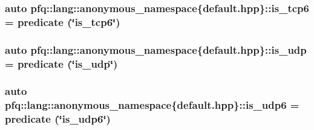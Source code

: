 \hypertarget{namespacepfq_1_1lang_1_1anonymous__namespace_02default_8hpp_03_a56d9bafc51ca6775da4ec3b816b1c7bb}{
\subsubsection[{is\+\_\+tcp6}]{\setlength{\rightskip}{0pt plus 5cm}auto pfq\+::lang\+::anonymous\+\_\+namespace\{default.\+hpp\}\+::is\+\_\+tcp6 = {\bf predicate} (\char`\"{}is\+\_\+tcp6\char`\"{})}}\label{namespacepfq_1_1lang_1_1anonymous__namespace_02default_8hpp_03_a56d9bafc51ca6775da4ec3b816b1c7bb}
\hypertarget{namespacepfq_1_1lang_1_1anonymous__namespace_02default_8hpp_03_a42701f36d9dde7f3636b90244d520a16}{
\subsubsection[{is\+\_\+udp}]{\setlength{\rightskip}{0pt plus 5cm}auto pfq\+::lang\+::anonymous\+\_\+namespace\{default.\+hpp\}\+::is\+\_\+udp = {\bf predicate} (\char`\"{}is\+\_\+udp\char`\"{})}}\label{namespacepfq_1_1lang_1_1anonymous__namespace_02default_8hpp_03_a42701f36d9dde7f3636b90244d520a16}
\hypertarget{namespacepfq_1_1lang_1_1anonymous__namespace_02default_8hpp_03_a8f3f79760f7be2ce30db5025bff887a6}{
\subsubsection[{is\+\_\+udp6}]{\setlength{\rightskip}{0pt plus 5cm}auto pfq\+::lang\+::anonymous\+\_\+namespace\{default.\+hpp\}\+::is\+\_\+udp6 = {\bf predicate} (\char`\"{}is\+\_\+udp6\char`\"{})}}\label{namespacepfq_1_1lang_1_1anonymous__namespace_02default_8hpp_03_a8f3f79760f7be2ce30db5025bff887a6}
